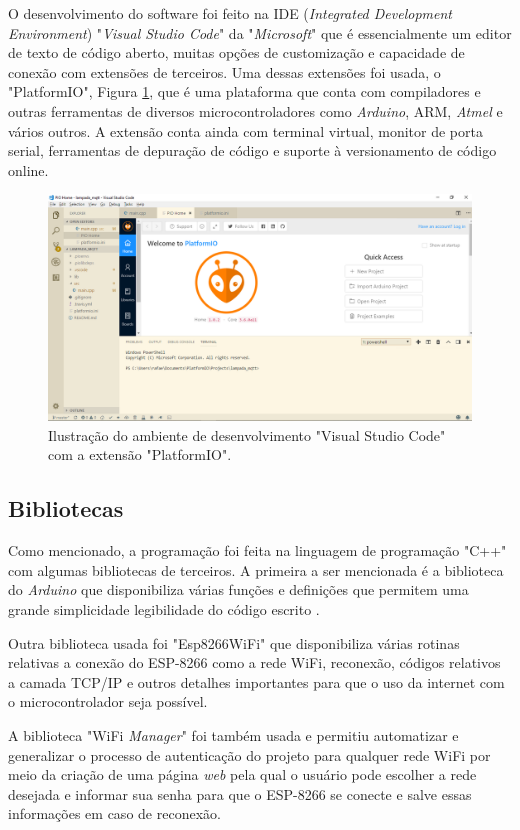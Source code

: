 O desenvolvimento do software foi feito na IDE (\textit{Integrated Development Environment}) "\textit{Visual Studio Code}" da "\textit{Microsoft}" que é essencialmente um editor de texto de código aberto, muitas opções de customização e capacidade de conexão com extensões de terceiros. Uma dessas extensões foi usada, o "PlatformIO", Figura \ref{pio}, que é uma plataforma que conta com compiladores e outras ferramentas de diversos microcontroladores como \textit{Arduino}, ARM, \textit{Atmel} e vários outros. A extensão conta ainda com terminal virtual, monitor de porta serial, ferramentas de depuração de código e suporte à versionamento de código online.

\begin{figure}[ht]
    \begin{center}
    \includegraphics[width=\textwidth]{figuras/pio.PNG}
    \end{center}
    \caption[Ilustração do Visual Studio Code com o PlatformIO.]{Ilustração do ambiente de desenvolvimento "Visual Studio Code" com a extensão "PlatformIO".}
    \label{pio}
\end{figure}

\subsection{Bibliotecas}

Como mencionado, a programação foi feita na linguagem de programação "C++" com algumas bibliotecas de terceiros. A primeira a ser mencionada é a biblioteca do \textit{Arduino} que disponibiliza várias funções e definições que permitem uma grande simplicidade legibilidade do código escrito \cite{arduino}.

Outra biblioteca usada foi "Esp8266WiFi" \cite{espwifi}que disponibiliza várias rotinas relativas a conexão do ESP-8266 como a rede WiFi, reconexão, códigos relativos a camada TCP/IP e outros detalhes importantes para que o uso da internet com o microcontrolador seja possível.

A biblioteca "WiFi \textit{Manager}" \cite{wifimng} foi também usada e permitiu automatizar e generalizar o processo de autenticação do projeto para qualquer rede WiFi por meio da criação de uma página \textit{web} pela qual o usuário pode escolher a rede desejada e informar sua senha para que o ESP-8266 se conecte e salve essas informações em caso de reconexão.

